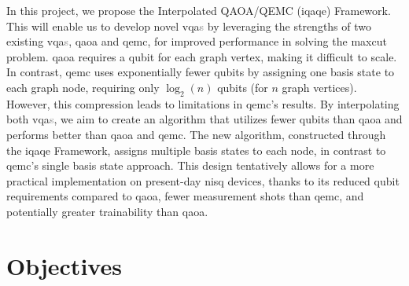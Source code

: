 

In this project, we propose the Interpolated QAOA/QEMC (\acrshort{iqaqe}) Framework. This will enable us to develop novel \acrshort{vqa}\textcolor{gray}{s} by leveraging the strengths of two existing \acrshort{vqa}\textcolor{gray}{s}, \acrshort{qaoa} and \acrshort{qemc}, for improved performance in solving the \acrshort{maxcut} problem. \acrshort{qaoa} requires a qubit for each graph vertex, making it difficult to scale. In contrast, \acrshort{qemc} uses exponentially fewer qubits by assigning one basis state to each graph node, requiring only $\log_2(n)$ qubits (for $n$ graph vertices). However, this compression leads to limitations in \acrshort{qemc}'s results. By interpolating both \acrshort{vqa}\textcolor{gray}{s}, we aim to create an algorithm that utilizes fewer qubits than \acrshort{qaoa} and performs better than \acrshort{qaoa} and \acrshort{qemc}. The new algorithm, constructed through the \acrshort{iqaqe} Framework, assigns multiple basis states to each node, in contrast to \acrshort{qemc}'s single basis state approach. This design tentatively allows for a more practical implementation on present-day \acrshort{nisq} devices, thanks to its reduced qubit requirements compared to \acrshort{qaoa}, fewer measurement shots than \acrshort{qemc}, and potentially greater trainability than \acrshort{qaoa}.

\section{Objectives} %
\label{section:objectives}




